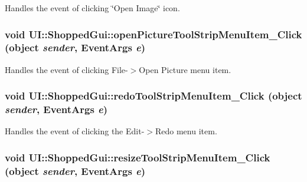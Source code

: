 \label{class_u_i_1_1_shopped_gui_a5a4be38d87e3d968e9336400e572b646}
Handles the event of clicking \char`\"{}Open Image\char`\"{} icon. \hypertarget{class_u_i_1_1_shopped_gui_a059988dec5a74fcc82ee2eb503d49118}{
\subsubsection[{openPictureToolStripMenuItem\_\-Click}]{\setlength{\rightskip}{0pt plus 5cm}void UI::ShoppedGui::openPictureToolStripMenuItem\_\-Click (object {\em sender}, \/  EventArgs {\em e})}}
\label{class_u_i_1_1_shopped_gui_a059988dec5a74fcc82ee2eb503d49118}
Handles the event of clicking File-\/$>$Open Picture menu item. \hypertarget{class_u_i_1_1_shopped_gui_a5828d5deddf5b8453e01db469a1a6f83}{
\subsubsection[{redoToolStripMenuItem\_\-Click}]{\setlength{\rightskip}{0pt plus 5cm}void UI::ShoppedGui::redoToolStripMenuItem\_\-Click (object {\em sender}, \/  EventArgs {\em e})}}
\label{class_u_i_1_1_shopped_gui_a5828d5deddf5b8453e01db469a1a6f83}
Handles the event of clicking the Edit-\/$>$Redo menu item. \hypertarget{class_u_i_1_1_shopped_gui_a05e2b57477f10f88b1ee06b6b5aa4d86}{
\subsubsection[{resizeToolStripMenuItem\_\-Click}]{\setlength{\rightskip}{0pt plus 5cm}void UI::ShoppedGui::resizeToolStripMenuItem\_\-Click (object {\em sender}, \/  EventArgs {\em e})}}
